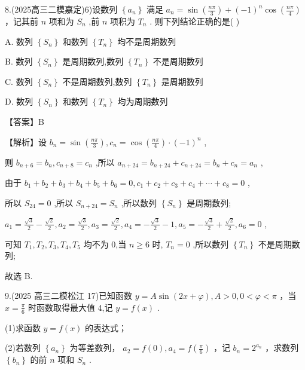 \documentclass[10pt]{article}
\begin{document}
8.(2025高三二模嘉定)6)设数列 \(\left\{  {a}_{n}\right\}\) 满足 \({a}_{n} = \sin \left( \frac{n\pi }{3}\right)  + {\left( -1\right) }^{n}\cos \left( \frac{n\pi }{4}\right)\) ，记其前 \(n\) 项和为 \({S}_{n}\) ,前 \(n\) 项积为 \({T}_{n}\) . 则下列结论正确的是( )

A. 数列 \(\left\{  {S}_{n}\right\}\) 和数列 \(\left\{  {T}_{n}\right\}\) 均不是周期数列

B. 数列 \(\left\{  {S}_{n}\right\}\) 是周期数列,数列 \(\left\{  {T}_{n}\right\}\) 不是周期数列

C. 数列 \(\left\{  {S}_{n}\right\}\) 不是周期数列,数列 \(\left\{  {T}_{n}\right\}\) 是周期数列

D. 数列 \(\left\{  {S}_{n}\right\}\) 和数列 \(\left\{  {T}_{n}\right\}\) 均为周期数列

【答案】B

【解析】设 \({b}_{n} = \sin \left( \frac{n\pi }{3}\right) ,{c}_{n} = \cos \left( \frac{n\pi }{4}\right)  \cdot  {\left( -1\right) }^{n}\) ,

则 \({b}_{n + 6} = {b}_{n},{c}_{n + 8} = {c}_{n}\) ,所以 \({a}_{n + {24}} = {b}_{n + {24}} + {c}_{n + {24}} = {b}_{n} + {c}_{n} = {a}_{n}\) ,

由于 \({b}_{1} + {b}_{2} + {b}_{3} + {b}_{4} + {b}_{5} + {b}_{6} = 0,{c}_{1} + {c}_{2} + {c}_{3} + {c}_{4} + \cdots  + {c}_{8} = 0\) ,

所以 \({S}_{24} = 0\) ,所以 \({S}_{n + {24}} = {S}_{n}\) ,所以数列 \(\left\{  {S}_{n}\right\}\) 是周期数列;

\({a}_{1} = \frac{\sqrt{3}}{2} - \frac{\sqrt{2}}{2},{a}_{2} = \frac{\sqrt{3}}{2},{a}_{3} = \frac{\sqrt{2}}{2},{a}_{4} =  - \frac{\sqrt{3}}{2} - 1,{a}_{5} =  - \frac{\sqrt{3}}{2} + \frac{\sqrt{2}}{2},{a}_{6} = 0\) ,

可知 \({T}_{1},{T}_{2},{T}_{3},{T}_{4},{T}_{5}\) 均不为 0,当 \(n \geq  6\) 时, \({T}_{n} = 0\) ,所以数列 \(\left\{  {T}_{n}\right\}\) 不是周期数列;

故选 B.

9.(2025 高三二模松江 17)已知函数 \(y = A\sin \left( {{2x} + \varphi }\right) ,A > 0,0 < \varphi  < \pi\) ，当 \(x = \frac{\pi }{6}\) 时函数取得最大值 4,记 \(y = f\left( x\right)\) .

(1)求函数 \(y = f\left( x\right)\) 的表达式；

(2)若数列 \(\left\{  {a}_{n}\right\}\) 为等差数列， \({a}_{2} = f\left( 0\right) ,{a}_{4} = f\left( \frac{\pi }{6}\right)\) ，记 \({b}_{n} = {2}^{{a}_{n}}\) ，求数列 \(\left\{  {b}_{n}\right\}\) 的前 \(n\) 项和 \({S}_{n}\) .
\end{document}
